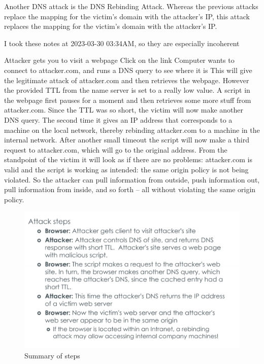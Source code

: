 \documentclass[../notes.tex]{subfiles}
\begin{document}
Another DNS attack is the DNS Rebinding Attack.
Whereas the previous attacks replace the mapping for the victim's domain with the attacker's IP, this attack replaces the mapping for the victim's domain with the attacker's IP.


\begin{blockquote}
    I took these notes at 2023-03-30 03:34AM, so they are especially incoherent
\end{blockquote}



Attacker gets you to visit a webpage
Click on the link
Computer wants to connect to attacker.com, and runs a DNS query to see where it is
This will give the legitimate attack of attacker.com and then retrieves the webpage. However the provided TTL from the name server is set to a really low value.
A script in the webpage first pauses for a moment and then retrieves some more stuff from attacker.com. Since the TTL was so short, the victim will now make another DNS query. 
The second time it gives an IP address that corresponds to a machine on the local network, thereby rebinding attacker.com to a machine in the internal network.
After another small timeout the script will now make a third request to attacker.com, which will go to the original address.
From the standpoint of the victim it will look as if there are no problems: attacker.com is valid and the script is working as intended: the same origin policy is not being violated.
So the attacker can pull information from outside, push information out, pull information from inside, and so forth -- all without violating the same origin policy.

\begin{figure}[H]
    \centering
    \includegraphics[width=0.8\linewidth]{img/image_2023-03-30-03-33-43.png}
    \caption{Summary of steps}
\end{figure}
\end{document}
